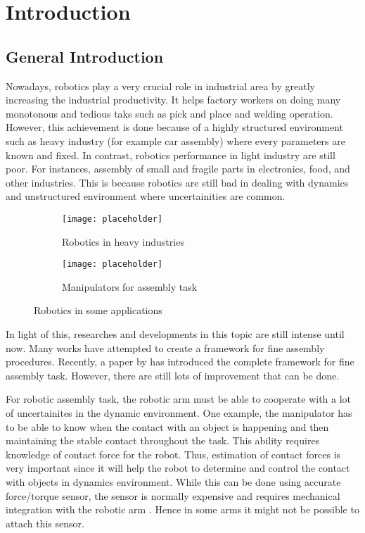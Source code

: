 \chapter{Introduction}
\section{General Introduction}

Nowadays, robotics play a very crucial role in industrial area by greatly increasing the industrial productivity. It helps factory workers on doing many monotonous and tedious taks such as pick and place and welding operation. However, this achievement is done because of a highly structured environment such as heavy industry (for example car assembly) where every parameters are known and fixed. In contrast, robotics performance in light industry are still poor. For instances, assembly of small and fragile parts in electronics, food, and other industries. This is because robotics are still bad in dealing with dynamics and unstructured environment where uncertainities are common. 

\begin{figure}[h]
  \begin{subfigure}[t]{0.5\textwidth}
    \centering
    \texttt{[image: placeholder]} 
    \caption{Robotics in heavy industries}
  \end{subfigure}
  \begin{subfigure}[t]{0.5\textwidth}
    \centering
    \texttt{[image: placeholder]}
    \caption{Manipulators for assembly task}
  \end{subfigure}
  \caption{Robotics in some applications}
\end{figure}


In light of this, researches and developments in this topic are still intense until now. Many works have attempted to create a framework for fine assembly procedures. Recently, a paper by \cite{aaaa} has introduced the complete framework for fine assembly task. However, there are still lots of improvement that can be done.


For robotic assembly task, the robotic arm must be able to cooperate with a lot of uncertainites in the dynamic environment. One example, the manipulator has to be able to know when the contact with an object is happening and then maintaining the stable contact throughout the task. This ability requires knowledge of contact force for the robot. Thus, estimation of contact forces is very important since it will help the robot to determine and control the contact with objects in dynamics environment. While this can be done using accurate force/torque sensor, the sensor is normally expensive and requires mechanical integration with the robotic arm \cite{Hao15}. Hence in some arms it might not be possible to attach this sensor.  
 
